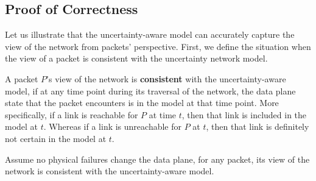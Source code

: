 \subsection{Proof of Correctness}
\label{sec:proof}

Let us illustrate that the uncertainty-aware model can accurately capture the view of the network from packets' perspective. First, we define the situation when the view of a packet is consistent with the uncertainty network model. 

\begin{definition}
A packet $P$'s view of the network is {\bf consistent} with the uncertainty-aware model, if at any time point during its traversal of the network, the data plane state that the packet encounters is in the model at that time point. More specifically, if a link is reachable for $P$ at time $t$, then that link is included in the model at $t$.
Whereas if a link is unreachable for $P$ at $t$, then that link is definitely not certain in the model at $t$.
\end{definition}

\begin{theorem}
Assume no physical failures change the data plane, for any packet, its view of the network is consistent with the uncertainty-aware model. 
\end{theorem}

